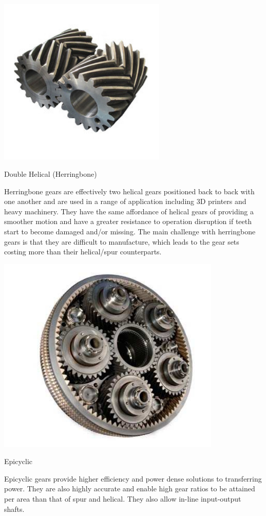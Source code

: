 \begin{marginfigure}
  \centering
  \includegraphics[width=0.6\textwidth]{figs/herringbone-gear.jpg}
  \caption{Double Helical (Herringbone)}
\end{marginfigure}
Herringbone gears are effectively two helical gears positioned back to back with one another and are used in a range of application including 3D printers and heavy machinery. They have the same affordance of helical gears of providing a smoother motion and have a greater resistance to operation disruption if teeth start to become damaged and/or missing. The main challenge with herringbone gears is that they are difficult to manufacture, which leads to the gear sets costing more than their helical/spur counterparts.

\begin{marginfigure}
  \centering
  \includegraphics[width=0.8\textwidth]{figs/planetary-gear.jpg}
  \caption{Epicyclic}
\end{marginfigure}
Epicyclic gears provide higher efficiency and power dense solutions to transferring power. They are also highly accurate and enable high gear ratios to be attained per area than that of spur and helical. They also allow in-line input-output shafts.

